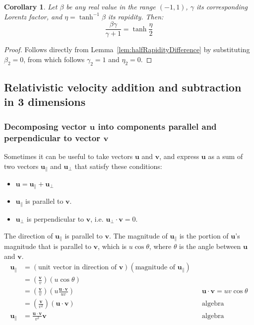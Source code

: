 \documentclass[a4paper]{article}
\theoremstyle{plain}
\newtheorem{corollary}[theorem]{Corollary}
\theoremstyle{definition}
\newcommand{\vect}[1]{\mathbf{#1}}
\begin{document}
\begin{corollary}
Let $\beta$ be any real value in the range $(-1,1)$, $\gamma$ its
corresponding Lorentz factor, and $\eta = \tanh^{-1} \beta$ its
rapidity.
Then:
\begin{equation}
\frac{\beta \gamma}{\gamma + 1} = \tanh \frac{\eta}{2}
\end{equation}
\end{corollary}

\begin{proof}
Follows directly from Lemma~\ref{lem:halfRapidityDifference} by
substituting $\beta_2 =0$, from which follows $\gamma_2 = 1$ and
$\eta_2=0$.
\end{proof}


\subsection{Relativistic velocity addition and subtraction in 3 dimensions}
\label{app:3drelvelocityaddsub}


\subsubsection{Decomposing vector $\vect{u}$ into components parallel and perpendicular to vector $\vect{v}$}
\label{app:decomposeVectorIntoParallelPlusPerpendicular}

Sometimes it can be useful to take vectors $\vect{u}$ and $\vect{v}$,
and express $\vect{u}$ as a sum of two vectors $\vect{u}_{\parallel}$
and $\vect{u}_{\perp}$ that satisfy these conditions:
\begin{itemize}
\item $\vect{u} = \vect{u}_{\parallel} + \vect{u}_{\perp}$
\item $\vect{u}_{\parallel}$ is parallel to $\vect{v}$.
\item $\vect{u}_{\perp}$ is perpendicular to $\vect{v}$,
  i.e. $\vect{u}_{\perp} \cdot \vect{v} = 0$.
\end{itemize}

The direction of $\vect{u}_{\parallel}$ is parallel to $\vect{v}$.
The magnitude of $\vect{u}_{\parallel}$ is the portion of $\vect{u}$'s
magnitude that is parallel to $\vect{v}$, which is $u \cos \theta$,
where $\theta$ is the angle between $\vect{u}$ and $\vect{v}$.
\begin{align}
\vect{u}_{\parallel}
  & = (\text{unit vector in direction of $\vect{v}$})(\text{magnitude of $\vect{u}_{\parallel}$}) \nonumber \\
  & = (\frac{\vect{v}}{v}) (u \cos \theta) \nonumber \\
  & = (\frac{\vect{v}}{v}) (u \frac{\vect{u} \cdot \vect{v}}{uv}) & & \text{$\vect{u} \cdot \vect{v} = uv \cos \theta$} \nonumber \\
  & = (\frac{\vect{v}}{v^2}) (\vect{u} \cdot \vect{v}) & & \text{algebra} \nonumber \\
\vect{u}_{\parallel}
  & = \frac{\vect{u} \cdot \vect{v}}{v^2} \vect{v} & & \text{algebra} \label{eqn:uParallel}
\end{align}
\end{document}
